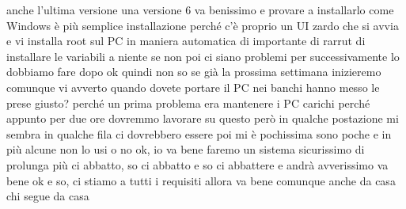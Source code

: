anche l'ultima versione una versione 6 va benissimo e provare a installarlo come Windows è più semplice installazione perché c'è proprio un UI zardo che si avvia e vi installa root sul PC in maniera automatica di importante di rarrut di installare le variabili a niente se non poi ci siano problemi per successivamente lo dobbiamo fare dopo ok quindi non so se già la prossima settimana inizieremo comunque vi avverto quando dovete portare il PC nei banchi hanno messo le prese giusto? perché un prima problema era mantenere i PC carichi perché appunto per due ore dovremmo lavorare su questo però in qualche postazione mi sembra in qualche fila ci dovrebbero essere poi mi è pochissima sono poche e in più alcune non lo usi o no ok, io va bene faremo un sistema sicurissimo di prolunga più ci abbatto, so ci abbatto e so ci abbattere e andrà avverissimo va bene ok e so, ci stiamo a tutti i requisiti allora va bene comunque anche da casa chi segue da casa 

